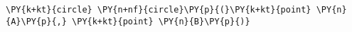 \begin{Verbatim}[commandchars=\\\{\}]
    \PY{k+kt}{circle} \PY{n+nf}{circle}\PY{p}{(}\PY{k+kt}{point} \PY{n}{A}\PY{p}{,} \PY{k+kt}{point} \PY{n}{B}\PY{p}{)}
\end{Verbatim}
